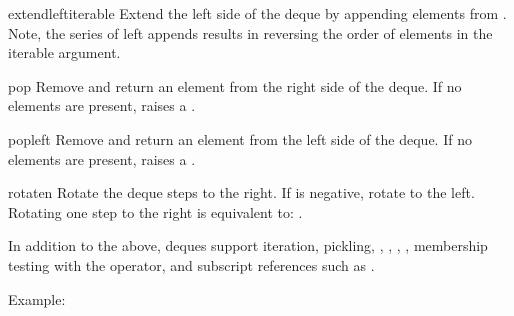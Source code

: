 \begin{methoddesc}{extendleft}{iterable}
   Extend the left side of the deque by appending elements from
   .  Note, the series of left appends results in
   reversing the order of elements in the iterable argument.
\end{methoddesc}

\begin{methoddesc}{pop}{}
   Remove and return an element from the right side of the deque.
   If no elements are present, raises a .
\end{methoddesc}

\begin{methoddesc}{popleft}{}
   Remove and return an element from the left side of the deque.
   If no elements are present, raises a .   
\end{methoddesc}

\begin{methoddesc}{rotate}{n}
   Rotate the deque  steps to the right.  If  is
   negative, rotate to the left.  Rotating one step to the right
   is equivalent to:  .
\end{methoddesc}

In addition to the above, deques support iteration, pickling, ,
, , ,
membership testing with the  operator, and subscript references
such as .

Example:

